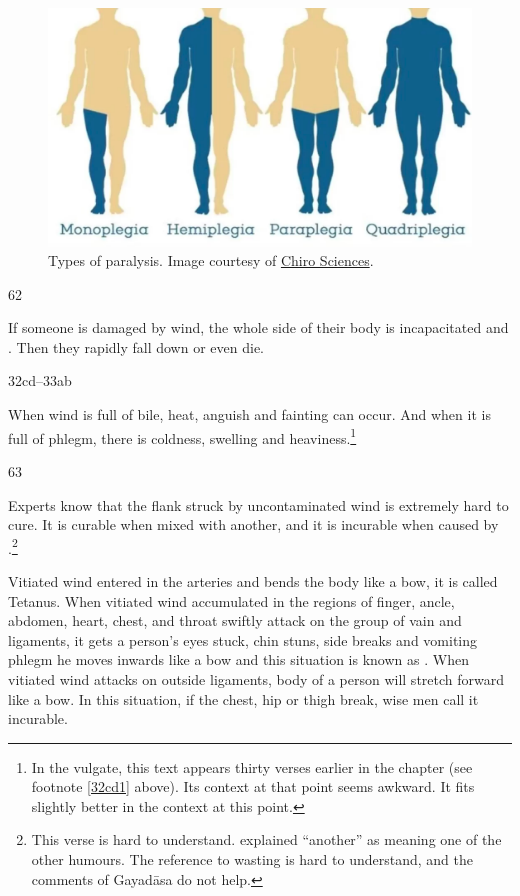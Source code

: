 \begin{translation}
\begin{figure}
    \centering
    \includegraphics[width=0.7\linewidth]{"media/Types of paralysis"}
    \caption{Types of paralysis. Image courtesy of 
    \href{https://www.facebook.com/chirosciences/photos/les-différents-types-de-paralysies/599879093836692/}{Chiro
     Sciences}.}
    \label{typesofparalysis}
\end{figure}
     
\item[62]

If someone is damaged by wind, the whole side of their body is
incapacitated and .  Then they rapidly
fall down or even die.

\item[32cd--33ab] 

When wind is full of bile, heat, anguish and
fainting can occur. And when it is full of phlegm, there is coldness,
swelling and heaviness.\footnote{In the vulgate, this text appears
    thirty verses earlier in the chapter (see footnote \ref{32cd1} above).
    Its context at that point seems awkward.\label{32cd2} It fits
    slightly better in the context at this point.}

\item[63]

Experts know that the flank struck by uncontaminated wind is extremely
hard to cure. It is curable when mixed with another, and it is
incurable when caused by .\footnote{This verse is
    hard to understand.   explained
    “another” as meaning one of the other humours.  The reference to wasting
    is hard to understand, and the comments of Gayadāsa \citep[266]{vulgate} 
    do not help.}


%


    {\ttfamily \bigskip
        [Draft:]
        \par\bigskip
        
Vitiated wind entered
in the arteries and bends the body like a bow, it is called
 Tetanus. When vitiated wind accumulated in the
regions of finger, ancle, abdomen, heart, chest, and throat
swiftly attack on the group of vain and ligaments, it gets a
person’s eyes stuck, chin stuns, side breaks and vomiting phlegm
he moves inwards like a bow and this situation is known as
. When vitiated wind attacks on
outside ligaments, body of a person will stretch forward like a
bow. In this situation, if the chest, hip or thigh break, wise men
call it incurable.

}
\end{translation}

